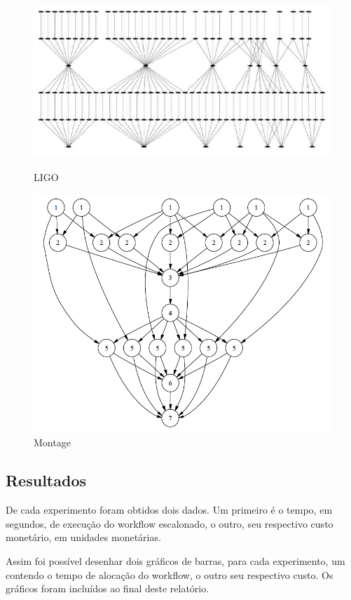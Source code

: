 \documentclass[a4paper,10pt]{article}
\begin{document}
\begin{figure}[!htb]
\includegraphics[scale=.25]{figures/ligo.png}
\caption{LIGO \protect\cite{bit}}
\label{ligo}

\includegraphics[scale=.25]{figures/montage.png}
\caption{Montage \protect\cite{bit}}
\label{montage}

\end{figure}

\subsection{Resultados}
\label{resultados}

De cada experimento foram obtidos dois dados. Um primeiro é o tempo, em segundos,
de execução do workflow escalonado, o outro, seu respectivo custo monetário, em 
unidades monetárias.

Assim foi possível desenhar dois gráficos de barras, para cada experimento, um
contendo o tempo de alocação do workflow, o outro seu respectivo custo. Os gráficos
foram incluídos ao final deste relatório.
\end{document}

